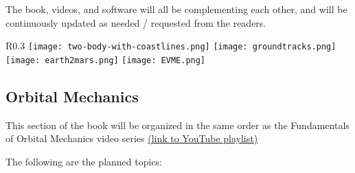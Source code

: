 \documentclass{article}
\begin{document}
The book, videos, and software will all be complementing each other, and will be
continuously updated as needed / requested from the readers.

\newpage

\begin{wrapfigure}{R}{0.3\textwidth}
\centering
\texttt{[image: two-body-with-coastlines.png]}
\texttt{[image: groundtracks.png]}
\texttt{[image: earth2mars.png]}
\texttt{[image: EVME.png]}
\end{wrapfigure}

\subsection{Orbital Mechanics}
This section of the book will be organized in the same order as the
Fundamentals of Orbital Mechanics video series \color{cyan}
\href{https://www.youtube.com/playlist?list=PLOIRBaljOV8hBJS4m6brpmUrncqkyXBjB}{(link to YouTube playlist)}\color{white}

\noindent
The following are the planned topics:
\end{document}
